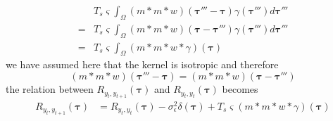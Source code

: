 \documentclass[]{article}
\begin{document}
\begin{align}
&T_s \varsigma\int_{\Omega} (m \ast m \ast w)\left(\boldsymbol \tau'''-\boldsymbol\tau\right)\gamma(\boldsymbol \tau''')d\boldsymbol \tau''' \nonumber \\
=&T_s \varsigma\int_{\Omega} (m \ast m \ast w)\left(\boldsymbol\tau-\boldsymbol \tau'''\right)\gamma(\boldsymbol \tau''')d\boldsymbol \tau''' \nonumber \\
=&T_s \varsigma\int_{\Omega} (m \ast m \ast w \ast \gamma)\left(\boldsymbol\tau\right)
\label{eq:ObsCrossCorr7}
\end{align}
we have assumed here that the kernel is isotropic and therefore
\begin{equation}
 (m \ast m \ast w)\left(\boldsymbol \tau'''-\boldsymbol\tau\right)=(m \ast m \ast w)\left(\boldsymbol\tau-\boldsymbol \tau'''\right)
\end{equation}
the relation between $R_{y_{t},y_{t+1}}(\boldsymbol{\tau})$ and $R_{y_{t},y_{t}}(\boldsymbol{\tau})$ becomes
\begin{align}
	R_{y_{t},y_{t+1}}(\boldsymbol{\tau}) &= R_{y_{t},y_{t}}(\boldsymbol{\tau})-\sigma_{\epsilon}^2\delta(\boldsymbol\tau)+T_s\varsigma\left(m\ast m\ast w\ast\gamma\right)\left(\boldsymbol\tau\right)
\end{align}
\end{document}
